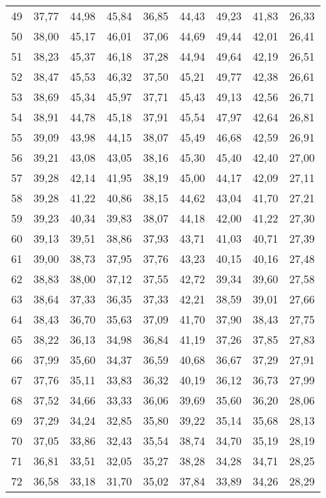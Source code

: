 \begin{longtable}{c c c c c c c c c}
49	& 37,77	& 44,98	& 45,84	& 36,85	& 44,43	& 49,23	& 41,83	& 26,33 \\
50	& 38,00	& 45,17	& 46,01	& 37,06	& 44,69	& 49,44	& 42,01	& 26,41 \\
51	& 38,23	& 45,37	& 46,18	& 37,28	& 44,94	& 49,64	& 42,19	& 26,51 \\
52	& 38,47	& 45,53	& 46,32	& 37,50	& 45,21	& 49,77	& 42,38	& 26,61 \\
53	& 38,69	& 45,34	& 45,97	& 37,71	& 45,43	& 49,13	& 42,56	& 26,71 \\
54	& 38,91	& 44,78	& 45,18	& 37,91	& 45,54	& 47,97	& 42,64	& 26,81 \\
55	& 39,09	& 43,98	& 44,15	& 38,07	& 45,49	& 46,68	& 42,59	& 26,91 \\
56	& 39,21	& 43,08	& 43,05	& 38,16	& 45,30	& 45,40	& 42,40	& 27,00 \\
57	& 39,28	& 42,14	& 41,95	& 38,19	& 45,00	& 44,17	& 42,09	& 27,11 \\
58	& 39,28	& 41,22	& 40,86	& 38,15	& 44,62	& 43,04	& 41,70	& 27,21 \\
59	& 39,23	& 40,34	& 39,83	& 38,07	& 44,18	& 42,00	& 41,22	& 27,30 \\
60	& 39,13	& 39,51	& 38,86	& 37,93	& 43,71	& 41,03	& 40,71	& 27,39 \\
61	& 39,00	& 38,73	& 37,95	& 37,76	& 43,23	& 40,15	& 40,16	& 27,48 \\
62	& 38,83	& 38,00	& 37,12	& 37,55	& 42,72	& 39,34	& 39,60	& 27,58 \\
63	& 38,64	& 37,33	& 36,35	& 37,33	& 42,21	& 38,59	& 39,01	& 27,66 \\
64	& 38,43	& 36,70	& 35,63	& 37,09	& 41,70	& 37,90	& 38,43	& 27,75 \\
65	& 38,22	& 36,13	& 34,98	& 36,84	& 41,19	& 37,26	& 37,85	& 27,83 \\
66	& 37,99	& 35,60	& 34,37	& 36,59	& 40,68	& 36,67	& 37,29	& 27,91 \\
67	& 37,76	& 35,11	& 33,83	& 36,32	& 40,19	& 36,12	& 36,73	& 27,99 \\
68	& 37,52	& 34,66	& 33,33	& 36,06	& 39,69	& 35,60	& 36,20	& 28,06 \\
69	& 37,29	& 34,24	& 32,85	& 35,80	& 39,22	& 35,14	& 35,68	& 28,13 \\
70	& 37,05	& 33,86	& 32,43	& 35,54	& 38,74	& 34,70	& 35,19	& 28,19 \\
71	& 36,81	& 33,51	& 32,05	& 35,27	& 38,28	& 34,28	& 34,71	& 28,25 \\
72	& 36,58	& 33,18	& 31,70	& 35,02	& 37,84	& 33,89	& 34,26	& 28,29 \\

\end{longtable}
